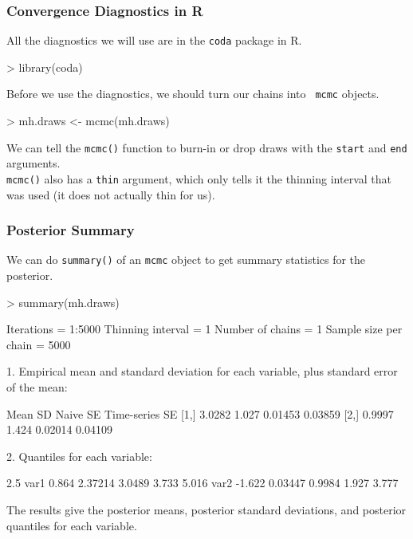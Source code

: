 \documentclass{beamer}
\begin{document}
\begin{frame}[fragile]
\frametitle{Convergence Diagnostics in R}
All the diagnostics we will use are in the {\tt coda} package in R.
\medskip
\pause
\tiny
\begin{Schunk}
\begin{Sinput}
> library(coda)
\end{Sinput}
\end{Schunk}
\normalsize
\bigskip
\pause
Before we use the diagnostics, we should turn our chains into {\tt
mcmc} objects.
\medskip
\pause
\tiny
\begin{Schunk}
\begin{Sinput}
> mh.draws <- mcmc(mh.draws)
\end{Sinput}
\end{Schunk}
\bigskip
\normalsize
\pause
We can tell the {\tt mcmc()} function to burn-in or drop draws with
the {\tt start} and {\tt end} arguments. \\
\bigskip
\pause
{\tt mcmc()} also has a {\tt thin} argument, which only tells it the
thinning interval that was used (it does not actually thin for us).
\end{frame}

\begin{frame}[fragile]
\frametitle{Posterior Summary}
\pause
We can do {\tt summary()} of an {\tt mcmc} object to get summary
statistics for the posterior.
\medskip
\pause
\tiny
\begin{Schunk}
\begin{Sinput}
> summary(mh.draws)
\end{Sinput}
\begin{Soutput}
Iterations = 1:5000
Thinning interval = 1 
Number of chains = 1 
Sample size per chain = 5000 

1. Empirical mean and standard deviation for each variable,
   plus standard error of the mean:

       Mean    SD Naive SE Time-series SE
[1,] 3.0282 1.027  0.01453        0.03859
[2,] 0.9997 1.424  0.02014        0.04109

2. Quantiles for each variable:

       2.5%
var1  0.864 2.37214 3.0489 3.733 5.016
var2 -1.622 0.03447 0.9984 1.927 3.777
\end{Soutput}
\end{Schunk}
\bigskip
\pause
\normalsize
The results give the posterior means, posterior standard deviations,
and posterior quantiles for each variable. 
\end{frame}
\end{document}
